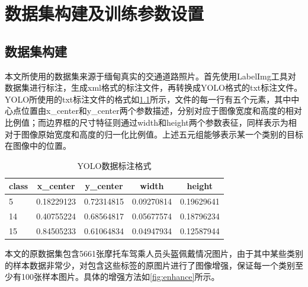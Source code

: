 \chapter{数据集构建及训练参数设置}

\section{数据集构建}
本文所使用的数据集来源于缅甸真实的交通道路照片。首先使用LabelImg工具对数据集进行标注，生成xml格式的标注文件，再转换成YOLO格式的txt标注文件。YOLO所使用的txt标注文件的格式如\ref{tab:format}所示，文件的每一行有五个元素，其中中心点位置由x\_center和y\_center两个参数描述，分别对应于图像宽度和高度的相对比例值；而边界框的尺寸特征则通过width和height两个参数表征，同样表示为相对于图像原始宽度和高度的归一化比例值。上述五元组能够表示某一个类别的目标在图像中的位置。

\begin{table}[htb]
      \centering
      \caption[目标数据]{YOLO数据标注格式\label{tab:format}}
      \begin{tabular}{lrrrr}
          \toprule
          \multicolumn{1}{c}{class} & \multicolumn{1}{c}{x\_center} & \multicolumn{1}{c}{y\_center} & \multicolumn{1}{c}{width} & \multicolumn{1}{c}{height} \\
          \midrule
          5 & 0.18229123 & 0.72314815 & 0.09270814 & 0.19629641 \\
          14 & 0.40755224 & 0.68564817 & 0.05677574 & 0.18796234 \\
          15 & 0.84505233 & 0.61064834 & 0.04947934 & 0.12587944 \\
          \bottomrule
      \end{tabular}
\end{table}


本文的原数据集包含5661张摩托车驾乘人员头盔佩戴情况图片，由于其中某些类别的样本数据非常少，对包含这些标签的原图片进行了图像增强，保证每一个类别至少有100张样本图片。具体的增强方法如\ref{fig:enhance}所示。


